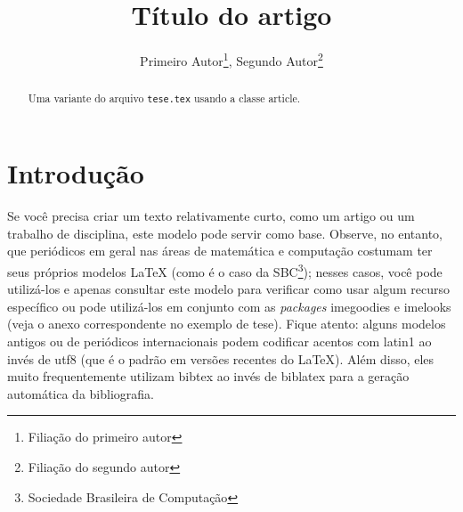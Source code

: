 \documentclass[a4paper,12pt,twoside,english,brazilian]{article}
\title{Título do artigo}
\author{
  Primeiro Autor\thanks{Filiação do primeiro autor},
  Segundo Autor\thanks{Filiação do segundo autor}
}
\date{}
\begin{document}
\maketitle
\thispagestyle{empty} %

\begin{abstract}
  Uma variante do arquivo \texttt{tese.tex} usando a classe \textsf{article}.
\end{abstract}

\section{Introdução}

Se você precisa criar um texto relativamente curto, como um artigo ou
um trabalho de disciplina, este modelo pode servir como base. Observe,
no entanto, que periódicos em geral nas áreas de matemática e computação
costumam ter seus próprios modelos \LaTeX{} (como é o caso da
SBC\footnote{Sociedade Brasileira de Computação}\nocite{sbctemplate});
nesses casos, você pode utilizá-los e apenas consultar este modelo para
verificar como usar algum recurso específico ou pode utilizá-los em
conjunto com as \textit{packages} \textsf{imegoodies} e \textsf{imelooks}
(veja o anexo correspondente no exemplo de tese). Fique atento: alguns
modelos antigos ou de periódicos internacionais podem codificar acentos
com \textsf{latin1} ao invés de \textsf{utf8} (que é o padrão em versões
recentes do \LaTeX). Além disso, eles muito frequentemente utilizam bibtex
ao invés de biblatex para a geração automática da bibliografia.

\printbibliography[
  title=\refname\label{sec:bib}, %
]
\end{document}
